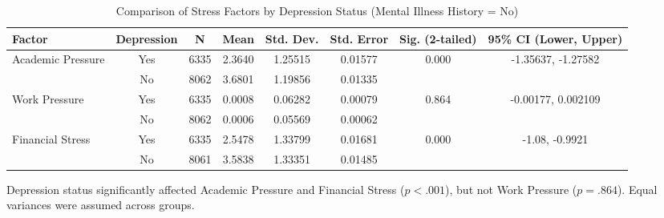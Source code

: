 \documentclass[conference]{IEEEtran}
\begin{document}
\begin{table*}[htbp]
\caption{Comparison of Stress Factors by Depression Status (Mental Illness History = No)}
\begin{center}
\begin{tabular}{|l|c|c|c|c|c|c|c|}
\hline
\textbf{Factor} & \textbf{Depression} & \textbf{N} & \textbf{Mean} & \textbf{Std. Dev.} & \textbf{Std. Error} & \textbf{Sig. (2-tailed)} & \textbf{95\% CI (Lower, Upper)} \\
\hline
\multirow{2}{*}{Academic Pressure} & Yes & 6335 & 2.3640 & 1.25515 & 0.01577 & \multirow{2}{*}{0.000} & -1.35637, -1.27582 \\
                                   & No  & 8062 & 3.6801 & 1.19856 & 0.01335 &                          &                      \\
\hline
\multirow{2}{*}{Work Pressure}     & Yes & 6335 & 0.0008 & 0.06282 & 0.00079 & \multirow{2}{*}{0.864} & -0.00177, 0.002109 \\
                                   & No  & 8062 & 0.0006 & 0.05569 & 0.00062 &                         &                     \\
\hline
\multirow{2}{*}{Financial Stress}  & Yes & 6335 & 2.5478 & 1.33799 & 0.01681 & \multirow{2}{*}{0.000} & -1.08, -0.9921 \\
                                   & No  & 8061 & 3.5838 & 1.33351 & 0.01485 &                        &                  \\
\hline
\end{tabular}
\label{tab:depression_factors}
\end{center}
\vspace{-1em}
\begin{flushleft}
\footnotesize Depression status significantly affected Academic Pressure and Financial Stress ($p < .001$), but not Work Pressure ($p = .864$). Equal variances were assumed across groups.
\end{flushleft}
\end{table*}
\end{document}
